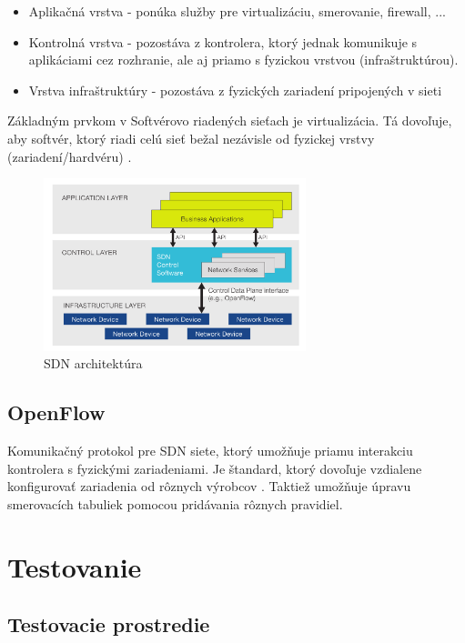 \documentclass[conference]{IEEEtran}
\begin{document}
\begin{itemize}
	\item{Aplikačná vrstva - ponúka služby pre virtualizáciu, smerovanie, firewall, ...}
	\item{Kontrolná vrstva - pozostáva z kontrolera, ktorý jednak komunikuje s aplikáciami cez rozhranie, ale aj priamo s fyzickou vrstvou (infraštruktúrou).}
	\item{Vrstva infraštruktúry - pozostáva z fyzických zariadení pripojených v sieti}
\end{itemize}

Základným prvkom v Softvérovo riadených sieťach je virtualizácia. Tá dovoľuje, aby softvér, ktorý riadi celú sieť bežal nezávisle od fyzickej vrstvy (zariadení/hardvéru) \cite{third}.

\begin{figure}[h!]
\centering
\includegraphics[width=3in]{../img/sdn-architecture}
\caption{SDN architektúra}
\end{figure}

\subsection{OpenFlow}

Komunikačný protokol pre SDN siete, ktorý umožňuje priamu interakciu kontrolera s fyzickými zariadeniami. Je štandard, ktorý dovoľuje vzdialene konfigurovať zariadenia od rôznych výrobcov \cite{fourth}. Taktiež umožňuje úpravu smerovacích tabuliek pomocou pridávania rôznych pravidiel.

\section{Testovanie}

\subsection{Testovacie prostredie}
\end{document}
